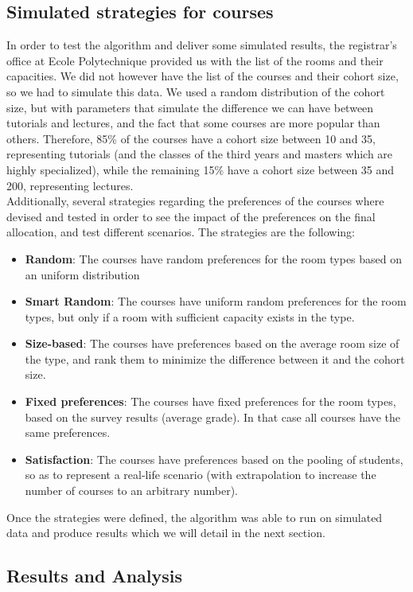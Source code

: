 \documentclass[a4paper, oneside]{article}
\theoremstyle{plain}
\begin{document}
\subsection{Simulated strategies for courses}

In order to test the algorithm and deliver some simulated results, the registrar's office at Ecole Polytechnique provided us with the list of the rooms and their capacities. 
We did not however have the list of the courses and their cohort size, so we had to simulate this data. We used a random distribution of the cohort size, but with parameters that 
simulate the difference we can have between tutorials and lectures, and the fact that some courses are more popular than others. Therefore, 85\% of the courses have a cohort size between 10 and 35,
representing tutorials (and the classes of the third years and masters which are highly specialized), while the remaining 15\% have a cohort size between 35 and 200, representing lectures.\\

Additionally, several strategies regarding the preferences of the courses where devised and tested in order to see the impact of the preferences on the final allocation, and test different 
scenarios. The strategies are the following:

\begin{itemize}
	\item \textbf{Random}: The courses have random preferences for the room types based on an uniform distribution
	\item \textbf{Smart Random}: The courses have uniform random preferences for the room types, but only if a room with sufficient capacity exists in the type. 
	\item \textbf{Size-based}: The courses have preferences based on the average room size of the type, and rank them to minimize the difference between it and the cohort size.
	\item \textbf{Fixed preferences}: The courses have fixed preferences for the room types, based on the survey results (average grade). In that case all courses have the same preferences.
	\item \textbf{Satisfaction}: The courses have preferences based on the pooling of students, so as to represent a real-life scenario (with extrapolation to increase the number of courses to an arbitrary number).
\end{itemize}

Once the strategies were defined, the algorithm was able to run on simulated data and produce results which we will detail in the next section.

\subsection{Results and Analysis}
\end{document}
